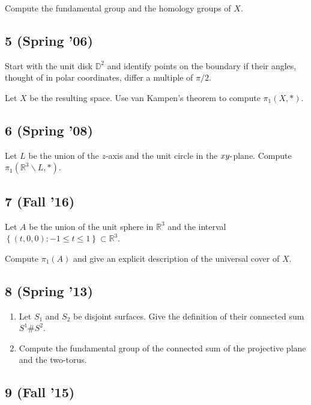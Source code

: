 Compute the fundamental group and the homology groups of \(X\).

\hypertarget{spring-06-2}{%
\subsection{5 (Spring '06)}\label{spring-06-2}}

Start with the unit disk \({\mathbb{D}}^2\) and identify points on the
boundary if their angles, thought of in polar coordinates, differ a
multiple of \(\pi/2\).

Let \(X\) be the resulting space. Use van Kampen's theorem to compute
\(\pi_1 (X, \ast)\).

\hypertarget{spring-08-1}{%
\subsection{6 (Spring '08)}\label{spring-08-1}}

Let \(L\) be the union of the \(z\)-axis and the unit circle in the
\(xy{\hbox{-}}\)plane. Compute
\(\pi_1 ({\mathbb{R}}^3 \backslash L, \ast)\).

\hypertarget{fall-16-2}{%
\subsection{7 (Fall '16)}\label{fall-16-2}}

Let \(A\) be the union of the unit sphere in \({\mathbb{R}}^3\) and the
interval
\(\left\{{(t, 0, 0) : -1 \leq t \leq 1}\right\} \subset {\mathbb{R}}^3\).

Compute \(\pi_1 (A)\) and give an explicit description of the universal
cover of \(X\).

\hypertarget{spring-13-1}{%
\subsection{8 (Spring '13)}\label{spring-13-1}}

\begin{enumerate}
\def\labelenumi{\alph{enumi}.}
\item
  Let \(S_1\) and \(S_2\) be disjoint surfaces. Give the definition of
  their connected sum \(S^1 \#S^2\).
\item
  Compute the fundamental group of the connected sum of the projective
  plane and the two-torus.
\end{enumerate}

\hypertarget{fall-15}{%
\subsection{9 (Fall '15)}\label{fall-15}}

